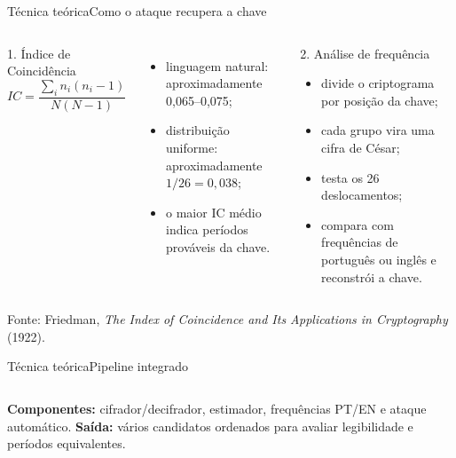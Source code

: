 \documentclass[10pt,aspectratio=169]{beamer}
\newcommand{\source}[1]{\vfill{\tiny\color{gray}Fonte: #1}}
\begin{document}
\begin{frame}{Técnica teórica}{Como o ataque recupera a chave}
  \begin{columns}[T,onlytextwidth]
      \begin{block}{1. Índice de Coincidência}
        \centering
        $IC=\dfrac{\sum_i n_i(n_i-1)}{N(N-1)}$
      \end{block}
      \begin{itemize}
        \item linguagem natural: aproximadamente 0,065--0,075;
        \item distribuição uniforme: aproximadamente $1/26=0,038$;
        \item o maior IC médio indica períodos prováveis da chave.
      \end{itemize}
      \begin{block}{2. Análise de frequência}
        \begin{itemize}
          \item divide o criptograma por posição da chave;
          \item cada grupo vira uma cifra de César;
          \item testa os 26 deslocamentos;
          \item compara com frequências de português ou inglês e reconstrói a chave.
        \end{itemize}
      \end{block}
  \end{columns}
  \source{Friedman, \textit{The Index of Coincidence and Its Applications in Cryptography} (1922).}
\end{frame}

\begin{frame}{Técnica teórica}{Pipeline integrado}
  \centering

  \vspace{12pt}
  \begin{columns}[T,onlytextwidth]
      \textbf{Componentes:} cifrador/decifrador, estimador, frequências PT/EN e ataque automático.
      \textbf{Saída:} vários candidatos ordenados para avaliar legibilidade e períodos equivalentes.
  \end{columns}
\end{frame}
\end{document}
